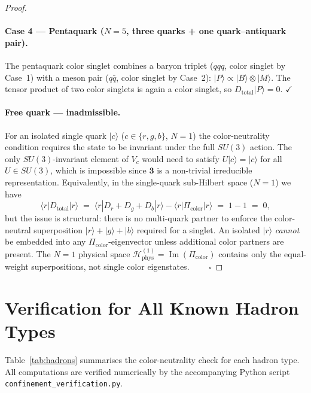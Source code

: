 \documentclass[12pt,a4paper]{article}
\newcommand{\Hphys}{\mathcal{H}_{\mathrm{phys}}}
\newcommand{\Picolor}{\Pi_{\mathrm{color}}}
\newcommand{\Dtotal}{D_{\mathrm{total}}}
\newcommand{\ket}[1]{|#1\rangle}
\newcommand{\expval}[2]{\langle #1 | #2 | #1 \rangle}
\begin{document}
\begin{proof}
\paragraph{Case 4 — Pentaquark ($N = 5$, three quarks + one quark--antiquark pair).}
The pentaquark color singlet combines a baryon triplet ($qqq$, color singlet by Case~1)
with a meson pair ($q\bar{q}$, color singlet by Case~2):
$\ket{P} \propto \ket{B} \otimes \ket{M}$.  The tensor product of two color singlets
is again a color singlet, so $\Dtotal\ket{P} = 0$. $\checkmark$

\paragraph{Free quark — inadmissible.}
For an isolated single quark $\ket{c}$ ($c \in \{r,g,b\}$, $N=1$) the
color-neutrality condition requires the state to be invariant under the full
$SU(3)$ action.  The only $SU(3)$-invariant element of $V_c$ would need to
satisfy $U\ket{c} = \ket{c}$ for all $U \in SU(3)$, which is impossible since
$\mathbf{3}$ is a non-trivial irreducible representation.  Equivalently, in
the single-quark sub-Hilbert space ($N=1$) we have
\begin{equation}
  \expval{r}{\Dtotal} \;=\; \expval{r}{D_r + D_g + D_b} - \expval{r}{\Picolor}
  \;=\; 1 - 1 \;=\; 0 ,
\end{equation}
but the issue is structural: there is no multi-quark partner to enforce the
color-neutral superposition $\ket{r} + \ket{g} + \ket{b}$ required for a
singlet.  An isolated $\ket{r}$ \emph{cannot} be embedded into any
$\Picolor$-eigenvector unless additional color partners are present.
The $N=1$ physical space $\Hphys^{(1)} = \operatorname{Im}(\Picolor)$ contains
only the equal-weight superpositions, not single color eigenstates. $\qquad\square$
\end{proof}

\section{Verification for All Known Hadron Types}
\label{sec:verification}

Table~\ref{tab:hadrons} summarises the color-neutrality check for each hadron type.
All computations are verified numerically by the accompanying Python script
\texttt{confinement\_verification.py}.
\end{document}
